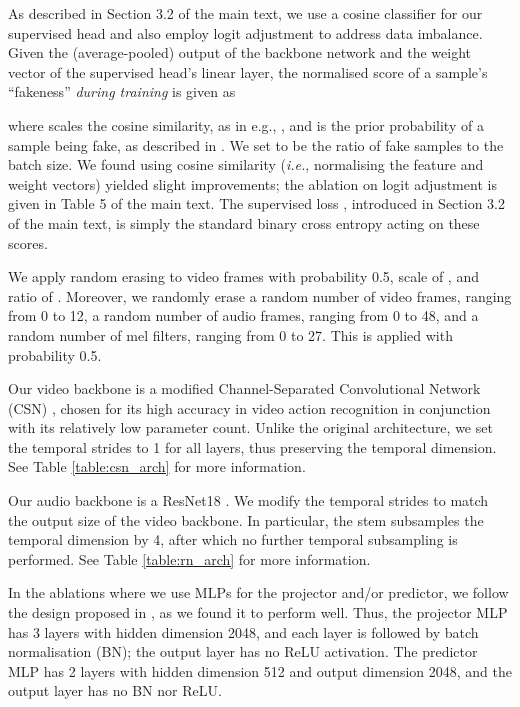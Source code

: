 \documentclass[10pt,twocolumn,letterpaper]{article}
\begin{document}
\begin{description}[wide,itemindent=\labelsep]
\item[Supervised loss details.] As described in Section 3.2 of the main text, we use a cosine classifier for our supervised head and also employ logit adjustment \cite{menon2020long} to address data imbalance. Given the (average-pooled) output  of the backbone network and the weight vector  of the supervised head's linear layer, the normalised score of a sample's ``fakeness'' \textit{during training} is given as 

where  scales the cosine similarity, as in e.g., \cite{wang2017normface}, and  is the prior probability of a sample being fake, as described in \cite{menon2020long}. We set  to be the ratio of fake samples to the batch size. We found using cosine similarity (\textit{i.e.}, normalising the feature and weight vectors) yielded slight improvements; the ablation on logit adjustment is given in Table 5 of the main text. The supervised loss , introduced in Section 3.2 of the main text, is simply the standard binary cross entropy acting on these scores.

\item[Random masking.] We apply random erasing to video frames with probability 0.5, scale of , and ratio of . Moreover, we randomly erase a random number of video frames, ranging from 0 to 12, a random number of audio frames, ranging from 0 to 48, and a random number of mel filters, ranging from 0 to 27. This is applied with probability 0.5.

\item[Backbones.] Our video backbone is a modified Channel-Separated Convolutional Network (CSN) \cite{tran2019video}, chosen for its high accuracy in video action recognition \cite{tran2019video} in conjunction with its relatively low parameter count. Unlike the original architecture, we set the temporal strides to 1 for all layers, thus preserving the temporal dimension. See Table \ref{table:csn_arch} for more information.

Our audio backbone is a ResNet18 \cite{he2016deep}. We modify the temporal strides to match the output size of the video backbone. In particular, the stem subsamples the temporal dimension by 4, after which no further temporal subsampling is performed. See Table \ref{table:rn_arch} for more information.

\item[Details on MLPs used in ablations.] In the ablations where we use MLPs for the projector and/or predictor, we follow the design proposed in \cite{chen2021exploring}, as we found it to perform well. Thus, the projector MLP has 3 layers with hidden dimension 2048, and each layer is followed by batch normalisation (BN); the output layer has no ReLU activation. The predictor MLP has 2 layers with hidden dimension 512 and output dimension 2048, and the output layer has no BN nor ReLU.


\end{description}
\end{document}
